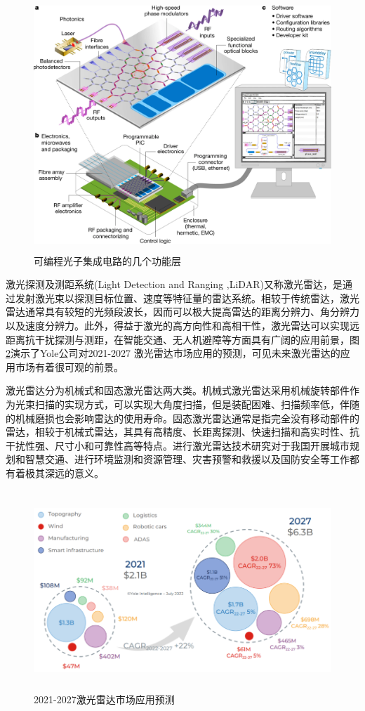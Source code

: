 \documentclass[UTF8,a4paper,12pt]{ctexart}
\numberwithin{equation}{section}
\begin{document}
\begin{figure}[htbp]
\centering %
\includegraphics[height=9.5cm,width=12cm]{fig0.png}
\caption{可编程光子集成电路的几个功能层}
\label{1-1}
\end{figure}

激光探测及测距系统(Light Detection and Ranging ,LiDAR)又称激光雷达，是通过发射激光束以探测目标位置、速度等特征量的雷达系统。相较于传统雷达，激光雷达通常具有较短的光频段波长，因而可以极大提高雷达的距离分辨力、角分辨力以及速度分辨力。此外，得益于激光的高方向性和高相干性，激光雷达可以实现远距离抗干扰探测与测距，在智能交通、无人机避障等方面具有广阔的应用前景，图\ref{1-2}演示了Yole公司对2021-2027 激光雷达市场应用的预测，可见未来激光雷达的应用市场有着很可观的前景。


激光雷达分为机械式和固态激光雷达两大类。机械式激光雷达采用机械旋转部件作为光束扫描的实现方式，可以实现大角度扫描，但是装配困难、扫描频率低，伴随的机械磨损也会影响雷达的使用寿命。固态激光雷达通常是指完全没有移动部件的雷达，相较于机械式雷达，其具有高精度、长距离探测、快速扫描和高实时性、抗干扰性强、尺寸小和可靠性高等特点。进行激光雷达技术研究对于我国开展城市规划和智慧交通、进行环境监测和资源管理、灾害预警和救援以及国防安全等工作都有着极其深远的意义。

\begin{figure}[htbp]
\centering %
\includegraphics[height=7.5cm,width=14.2cm]{fig10.png}
\caption{2021-2027激光雷达市场应用预测}
\label{1-2}
\end{figure}
\end{document}
